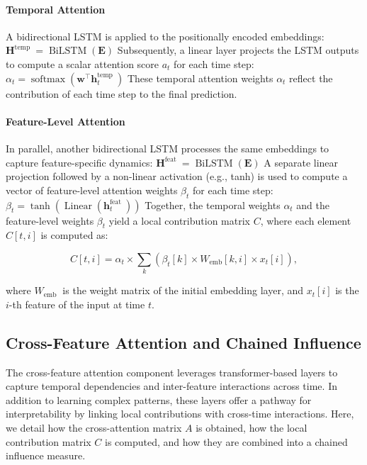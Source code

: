 \documentclass[letterpaper]{article}
\begin{document}
\begin{enumerate}
\paragraph{Temporal Attention} 
A bidirectional LSTM is applied to the positionally encoded embeddings:
$
\mathbf{H}^{\text {temp }}=\operatorname{BiLSTM}(\mathbf{E})
$
Subsequently, a linear layer projects the LSTM outputs to compute a scalar attention score $a_t$ for each time step:
$
\alpha_t=\operatorname{softmax}\left(\mathbf{w}^{\top} \mathbf{h}_t^{\text {temp }}\right)
$
These temporal attention weights $\alpha_t$ reflect the contribution of each time step to the final prediction.

\paragraph{Feature-Level Attention}
In parallel, another bidirectional LSTM processes the same embeddings to capture feature-specific dynamics:
$
\mathbf{H}^{\text {feat }}=\operatorname{BiLSTM}(\mathbf{E})
$
A separate linear projection followed by a non-linear activation (e.g., tanh) is used to compute a vector of feature-level attention weights $\beta_t$ for each time step:
$
\beta_t=\tanh \left(\operatorname{Linear}\left(\mathbf{h}_t^{\text {feat }}\right)\right)
$
Together, the temporal weights $\alpha_t$ and the feature-level weights $\beta_t$ yield a local contribution matrix $C$, where each element $C[t, i]$ is computed as:

$$
C[t, i]=\alpha_t \times \sum_k\left(\beta_t[k] \times W_{\mathrm{emb}}[k, i] \times x_t[i]\right),
$$

where $W_{\text {emb }}$ is the weight matrix of the initial embedding layer, and $x_t[i]$ is the $i$-th feature of the input at time $t$.

\subsection{Cross-Feature Attention and Chained Influence}

The cross-feature attention component leverages transformer-based layers to capture temporal dependencies and inter-feature interactions across time. In addition to learning complex patterns, these layers offer a pathway for interpretability by linking local contributions with cross-time interactions. Here, we detail how the cross-attention matrix $A$ is obtained, how the local contribution matrix $C$ is computed, and how they are combined into a chained influence measure.


\end{enumerate}
\end{document}
